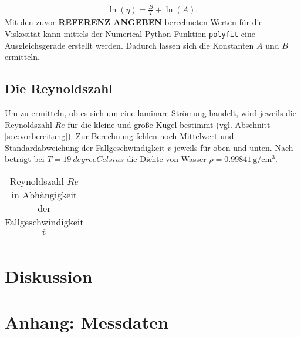 \begin{align}
    \ln {\left( \eta \right)} = \frac{B}{T} + \ln{\left( A \right)}.
\end{align}
Mit den zuvor \textbf{REFERENZ ANGEBEN} berechneten Werten für die Viskosität kann mittels der Numerical Python Funktion \texttt{polyfit}
eine Ausgleichsgerade erstellt werden. Dadurch lassen sich die Konstanten $A$ und $B$ ermitteln.


\subsection[]{Die Reynoldszahl}
Um zu ermitteln, ob es sich um eine laminare Strömung handelt, wird jeweils die Reynoldszahl $Re$ für die kleine und große Kugel bestimmt
(vgl. Abschnitt \ref{sec:vorbereitung}).
Zur Berechnung fehlen noch Mittelwert und Standardabweichung der Fallgeschwindigkeit $\overline{v}$ jeweils für oben und unten.
Nach \cite[]{geschke} beträgt bei $T = \qty{19}{degreeCelsius}$ die Dichte von Wasser $\rho = \qty{0.99841}{\g \per \cm^3}$.

\begin{table}
    \caption[]{Reynoldszahl $Re$ in Abhängigkeit der Fallgeschwindigkeit $\overline{v}$}
    \label{tab:reynold}
    \centering
    \begin{tabular}[]{S[table-format=]}
        
    \end{tabular}
\end{table}


\section{Diskussion}

\section*{Anhang: Messdaten}

\printbibliography

